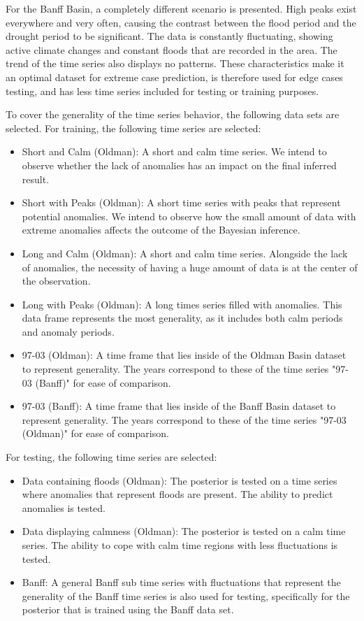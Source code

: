 For the Banff Basin, a completely different scenario is presented. High peaks exist everywhere and very often, causing the contrast between the flood period and the drought period to be significant. The data is constantly fluctuating, showing active climate changes and constant floods that are recorded in the area. The trend of the time series also displays no patterns. These characteristics make it an optimal dataset for extreme case prediction, is therefore used for edge cases testing, and has less time series included for testing or training purposes.

To cover the generality of the time series behavior, the following data sets are selected. For training, the following time series are selected:
\begin{itemize}
    \item Short and Calm (Oldman): A short and calm time series. We intend to observe whether the lack of anomalies has an impact on the final inferred result.
    \item Short with Peaks (Oldman): A short time series with peaks that represent potential anomalies. We intend to observe how the small amount of data with extreme anomalies affects the outcome of the Bayesian inference.
    \item Long and Calm (Oldman): A short and calm time series. Alongside the lack of anomalies, the necessity of having a huge amount of data is at the center of the observation.
    \item Long with Peaks (Oldman): A long times series filled with anomalies. This data frame represents the most generality, as it includes both calm periods and anomaly periods.
    \item 97-03 (Oldman): A time frame that lies inside of the Oldman Basin dataset to represent generality. The years correspond to these of the time series "97-03 (Banff)" for ease of comparison.
    \item 97-03 (Banff): A time frame that lies inside of the Banff Basin dataset to represent generality. The years correspond to these of the time series "97-03 (Oldman)" for ease of comparison.
\end{itemize}
For testing, the following time series are selected:
\begin{itemize}
    \item Data containing floods (Oldman): The posterior is tested on a time series where anomalies that represent floods are present. The ability to predict anomalies is tested.
    \item Data displaying calmness (Oldman): The posterior is tested on a calm time series. The ability to cope with calm time regions with less fluctuations is tested.
    \item Banff: A general Banff sub time series with fluctuations that represent the generality of the Banff time series is also used for testing, specifically for the posterior that is trained using the Banff data set.
\end{itemize}

